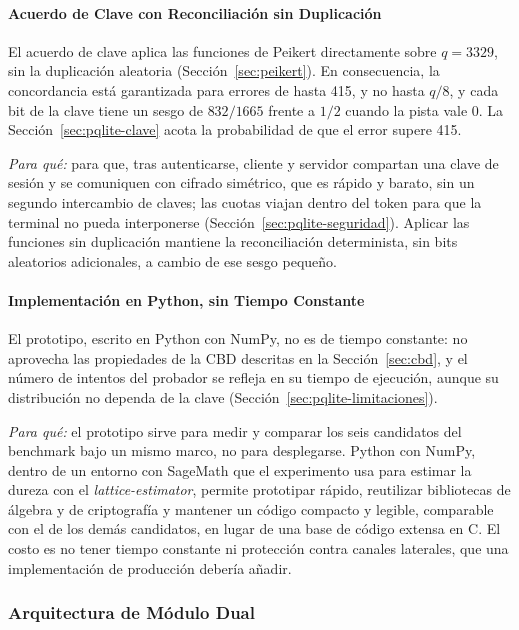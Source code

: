 \paragraph{Acuerdo de Clave con Reconciliación sin Duplicación}
El acuerdo de clave aplica las funciones de Peikert directamente sobre $q = 3329$, sin la duplicación aleatoria (Sección~\ref{sec:peikert}). En consecuencia, la concordancia está garantizada para errores de hasta 415, y no hasta $q/8$, y cada bit de la clave tiene un sesgo de $832/1665$ frente a $1/2$ cuando la pista vale 0. La Sección~\ref{sec:pqlite-clave} acota la probabilidad de que el error supere 415.

\textit{Para qué:} para que, tras autenticarse, cliente y servidor compartan una clave de sesión y se comuniquen con cifrado simétrico, que es rápido y barato, sin un segundo intercambio de claves; las cuotas viajan dentro del token para que la terminal no pueda interponerse (Sección~\ref{sec:pqlite-seguridad}). Aplicar las funciones sin duplicación mantiene la reconciliación determinista, sin bits aleatorios adicionales, a cambio de ese sesgo pequeño.

\paragraph{Implementación en Python, sin Tiempo Constante}
El prototipo, escrito en Python con NumPy, no es de tiempo constante: no aprovecha las propiedades de la CBD descritas en la Sección~\ref{sec:cbd}, y el número de intentos del probador se refleja en su tiempo de ejecución, aunque su distribución no dependa de la clave (Sección~\ref{sec:pqlite-limitaciones}).

\textit{Para qué:} el prototipo sirve para medir y comparar los seis candidatos del benchmark bajo un mismo marco, no para desplegarse. Python con NumPy, dentro de un entorno con SageMath que el experimento usa para estimar la dureza con el \textit{lattice-estimator}, permite prototipar rápido, reutilizar bibliotecas de álgebra y de criptografía y mantener un código compacto y legible, comparable con el de los demás candidatos, en lugar de una base de código extensa en C. El costo es no tener tiempo constante ni protección contra canales laterales, que una implementación de producción debería añadir.

\subsubsection{Arquitectura de Módulo Dual}
\label{sec:modulo-dual}

